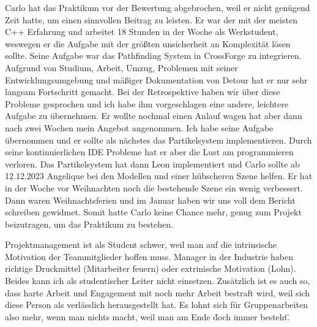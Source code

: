 Carlo hat das Praktikum vor der Bewertung abgebrochen, weil er nicht genügend Zeit hatte, um einen sinnvollen Beitrag zu leisten. Er war der mit der meisten C++ Erfahrung und arbeitet 18 Stunden in der Woche als Werkstudent, weswegen er die Aufgabe mit der größten unsicherheit an Komplexität lösen sollte. Seine Aufgabe war das Pathfinding System in CrossForge zu integrieren. Aufgrund von Studium, Arbeit, Umzug, Problemen mit seiner Entwicklungsumgebung und mäßiger Dokumentation von Detour hat er nur sehr langsam Fortschritt gemacht.  Bei der Retrospektive haben wir über diese Probleme gesprochen und ich habe ihm vorgeschlagen eine andere, leichtere Aufgabe zu übernehmen. Er wollte nochmal einen Anlauf wagen hat aber dann nach zwei Wochen mein Angebot angenommen. Ich habe seine Aufgabe übernommen und er sollte als nächstes das Partikelsystem implementieren. Durch seine kontinuierlichen IDE Probleme hat er aber die Lust am programmieren verloren. Das Partikelsystem hat dann Leon implementiert und Carlo sollte ab 12.12.2023 Angelique bei den Modellen und einer hübscheren Szene helfen. Er hat in der Woche vor Weihnachten noch die bestehende Szene ein wenig verbessert. Dann waren Weihnachtsferien und im Januar haben wir uns voll dem Bericht schreiben gewidmet. Somit hatte Carlo keine Chance mehr, genug zum Projekt beizutragen, um das Praktikum zu bestehen.


Projektmanagement ist als Student schwer, weil man auf die intrinsische Motivation der Teammitglieder hoffen muss. Manager in der Industrie haben richtige Druckmittel (Mitarbeiter feuern) oder extrinische Motivation (Lohn). Beides kann ich als studentischer Leiter nicht einsetzen. Zusätzlich ist es auch so, dass harte Arbeit und Engagement mit noch mehr Arbeit bestraft wird, weil sich diese Person als verlässlich herausgestellt hat. Es lohnt sich für Gruppenarbeiten also mehr, wenn man nichts macht, weil man am Ende \"doch immer besteht\".